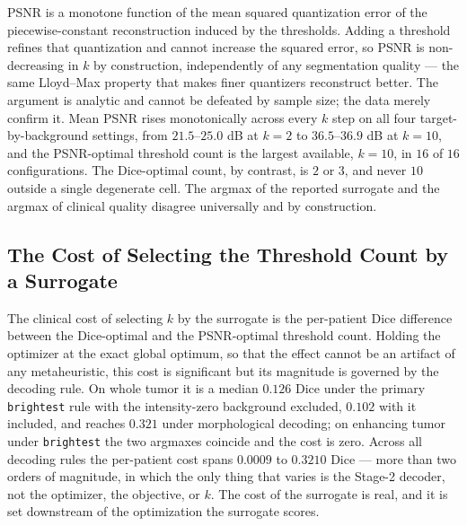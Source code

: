 PSNR is a monotone function of the mean squared quantization error of the
piecewise-constant reconstruction induced by the thresholds. Adding a threshold
refines that quantization and cannot increase the squared error, so PSNR is
non-decreasing in $k$ by construction, independently of any segmentation quality
--- the same Lloyd--Max property that makes finer quantizers reconstruct better.
The argument is analytic and cannot be defeated by sample size; the data merely
confirm it. Mean PSNR rises monotonically across every $k$ step on all four
target-by-background settings, from $21.5$--$25.0$ dB at $k=2$ to $36.5$--$36.9$
dB at $k=10$, and the PSNR-optimal threshold count is the largest available,
$k=10$, in $16$ of $16$ configurations. The Dice-optimal count, by contrast, is
$2$ or $3$, and never $10$ outside a single degenerate cell. The argmax of the
reported surrogate and the argmax of clinical quality disagree universally and
by construction.

\subsection{The Cost of Selecting the Threshold Count by a Surrogate}

The clinical cost of selecting $k$ by the surrogate is the per-patient Dice
difference between the Dice-optimal and the PSNR-optimal threshold count. Holding
the optimizer at the exact global optimum, so that the effect cannot be an
artifact of any metaheuristic, this cost is significant but its magnitude is
governed by the decoding rule. On whole tumor it is a median $0.126$ Dice under
the primary \texttt{brightest} rule with the intensity-zero background excluded,
$0.102$ with it included, and reaches $0.321$ under morphological decoding; on
enhancing tumor under \texttt{brightest} the two argmaxes coincide and the cost
is zero. Across all decoding rules the per-patient cost spans $0.0009$ to
$0.3210$ Dice --- more than two orders of magnitude, in which the only thing that
varies is the Stage-2 decoder, not the optimizer, the objective, or $k$. The cost
of the surrogate is real, and it is set downstream of the optimization the
surrogate scores.

